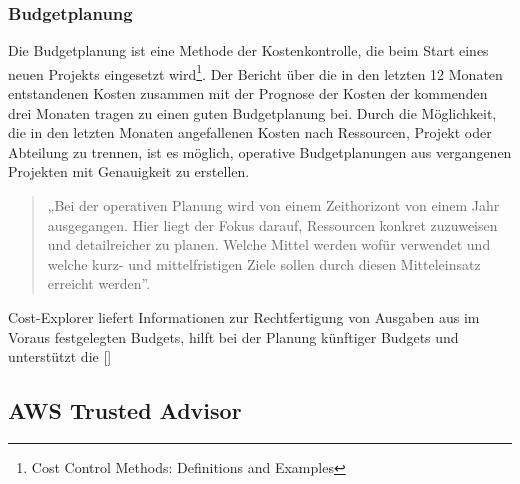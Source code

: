 \subsubsection*{Budgetplanung}
Die Budgetplanung ist eine Methode der Kostenkontrolle, die beim Start eines neuen Projekts eingesetzt wird\footnote{\cite{BUD2}Cost Control Methods: Definitions and Examples}. Der Bericht über die in den letzten 12 Monaten entstandenen Kosten zusammen mit der Prognose der Kosten der kommenden drei Monaten tragen zu einen guten Budgetplanung bei.
Durch die Möglichkeit, die in den letzten Monaten angefallenen Kosten nach Ressourcen, Projekt oder Abteilung zu trennen, ist es möglich, operative Budgetplanungen aus vergangenen Projekten mit Genauigkeit zu erstellen. 
\begin{quote}
  „Bei der operativen Planung wird von einem Zeithorizont von einem Jahr ausgegangen. Hier liegt der Fokus darauf, Ressourcen konkret zuzuweisen und detailreicher zu planen. Welche Mittel werden wofür verwendet und welche kurz- und mittelfristigen Ziele sollen durch diesen Mitteleinsatz erreicht werden”\cite{BUD1}.
\end{quote}

Cost-Explorer liefert Informationen zur Rechtfertigung von Ausgaben aus im Voraus festgelegten Budgets, hilft bei der Planung künftiger Budgets und unterstützt die []
\subsection{AWS Trusted Advisor}

